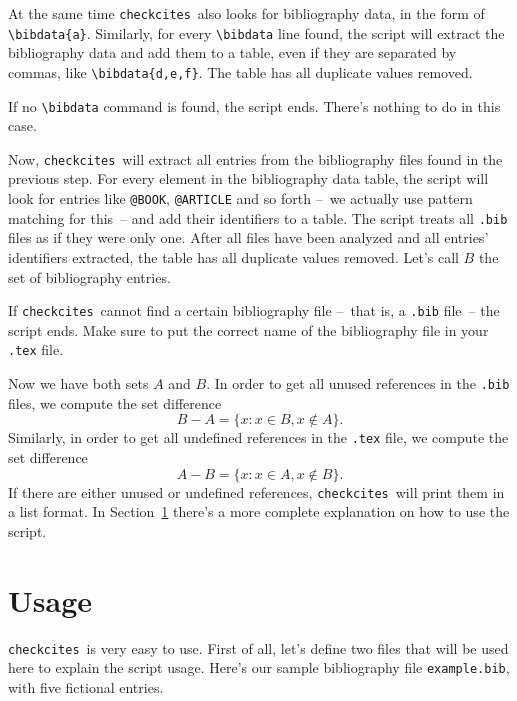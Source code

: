 \documentclass[12pt,a4paper]{article}
\newcommand{\checkcites}{\texttt{checkcites}}
\newenvironment{infoblock}[1]
  {\par\addvspace{\medskipamount}
   \begin{tcolorbox}[colframe=DarkTurquoise,coltitle=black,fonttitle=\bfseries,title=#1]}
  {\end{tcolorbox}\addvspace{\medskipamount}}
\begin{document}
At the same time \checkcites\ also looks for bibliography data, in the
form of \verb|\bibdata{a}|. Similarly, for every \verb|\bibdata| line
found, the script will extract the bibliography data and add them to a
table, even if they are separated by commas, like
\verb|\bibdata{d,e,f}|. The table has all duplicate values removed.

\begin{infoblock}{Attention!}
If no \verb|\bibdata| command is found, the script ends. There's
nothing to do in this case.
\end{infoblock}

Now, \checkcites\ will extract all entries from the bibliography files
found in the previous step. For every element in the bibliography data
table, the script will look for entries like \verb|@BOOK|,
\verb|@ARTICLE| and so forth --~we actually use pattern matching for
this~-- and add their identifiers to a table. The script treats all
\verb|.bib| files as if they were only one. After all files have been
analyzed and all entries' identifiers extracted, the table has all
duplicate values removed. Let's call $B$ the set of bibliography
entries.

\begin{infoblock}{Attention!}
If \checkcites\ cannot find a certain bibliography file --~that is, a
\verb|.bib| file~-- the script ends. Make sure to put the correct
name of the bibliography file in your \verb|.tex| file.
\end{infoblock}

Now we have both sets $A$ and $B$. In order to get all unused
references in the \verb|.bib| files, we compute the set difference
\[
B - A = \{ x : x \in B, x \notin A \}.
\] 
Similarly, in order to get all undefined references in the \verb|.tex|
file, we compute the set difference
\[
A - B = \{ x : x \in A, x \notin B \}.
\]
If there are either unused or undefined references, \checkcites\ will
print them in a list format. In Section~\ref{sec:usage} there's a more
complete explanation on how to use the script.

\section{Usage}
\label{sec:usage}

\checkcites\ is very easy to use. First of all, let's define two files
that will be used here to explain the script usage. Here's our sample
bibliography file \verb|example.bib|, with five fictional entries.
\end{document}
